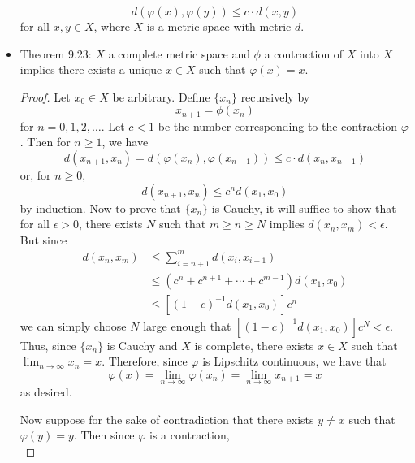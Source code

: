 \documentclass[../notes.tex]{subfiles}
\begin{document}
\begin{itemize}
    \begin{equation*}
        d(\varphi(x),\varphi(y)) \leq c\cdot d(x,y)
    \end{equation*}
    for all $x,y\in X$, where $X$ is a metric space with metric $d$.
    \item Theorem 9.23: $X$ a complete metric space and $\phi$ a contraction of $X$ into $X$ implies there exists a unique $x\in X$ such that $\varphi(x)=x$.
    \begin{proof}
        Let $x_0\in X$ be arbitrary. Define $\{x_n\}$ recursively by
        \begin{equation*}
            x_{n+1} = \phi(x_n)
        \end{equation*}
        for $n=0,1,2,\dots$. Let $c<1$ be the number corresponding to the contraction $\varphi$. Then for $n\geq 1$, we have
        \begin{equation*}
            d(x_{n+1},x_n) = d(\varphi(x_n),\varphi(x_{n-1})) \leq c\cdot d(x_n,x_{n-1})
        \end{equation*}
        or, for $n\geq 0$,
        \begin{equation*}
            d(x_{n+1},x_n) \leq c^nd(x_1,x_0)
        \end{equation*}
        by induction. Now to prove that $\{x_n\}$ is Cauchy, it will suffice to show that for all $\epsilon>0$, there exists $N$ such that $m\geq n\geq N$ implies $d(x_n,x_m)<\epsilon$. But since
        \begin{align*}
            d(x_n,x_m) &\leq \sum_{i=n+1}^md(x_i,x_{i-1})\\
            &\leq (c^n+c^{n+1}+\cdots+c^{m-1})d(x_1,x_0)\\
            &\leq [(1-c)^{-1}d(x_1,x_0)]c^n
        \end{align*}
        we can simply choose $N$ large enough that $[(1-c)^{-1}d(x_1,x_0)]c^N<\epsilon$. Thus, since $\{x_n\}$ is Cauchy and $X$ is complete, there exists $x\in X$ such that $\lim_{n\to\infty}x_n=x$. Therefore, since $\varphi$ is Lipschitz continuous, we have that
        \begin{equation*}
            \varphi(x) = \lim_{n\to\infty}\varphi(x_n)
            = \lim_{n\to\infty}x_{n+1}
            = x
        \end{equation*}
        as desired.\par
        Now suppose for the sake of contradiction that there exists $y\neq x$ such that $\varphi(y)=y$. Then since $\varphi$ is a contraction,
        \begin{equation*}

\end{equation*}
\end{proof}
\end{itemize}
\end{document}
